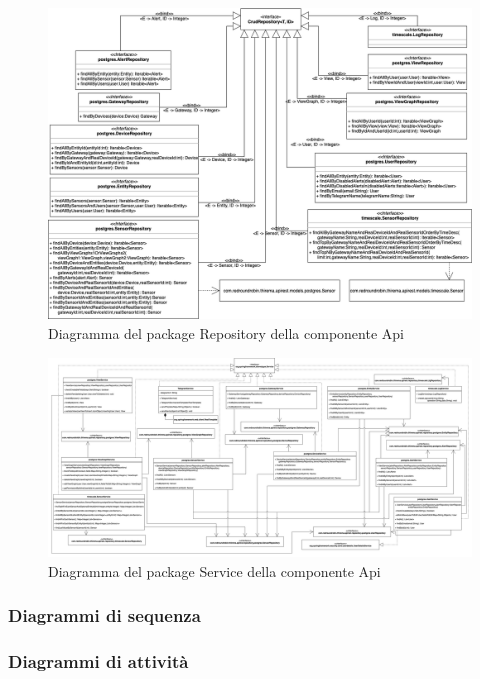 		\begin{landscape}
		\begin{figure}[H]
			\centering
			\includegraphics[scale=0.550]{res/images/API/RepositoryPackage.png}
			\caption{Diagramma del package Repository della componente Api}
		\end{figure}
		\begin{figure}[H]
			\centering
			\includegraphics[scale=0.300]{res/images/API/ServicePackage.png}
			\caption{Diagramma del package Service della componente Api}
		\end{figure}
		\end{landscape}
	\subsubsection{Diagrammi di sequenza}
	\subsubsection{Diagrammi di attività}

